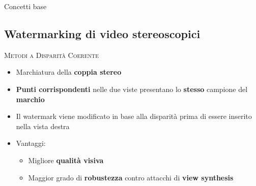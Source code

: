 \documentclass{beamer}
\begin{document}
\begin{section}{Concetti base}
\subsection{Watermarking di video stereoscopici}



\begin{frame}[t]{\textsc{Metodi a Disparit\`{a} Coerente}}
\vspace{1em}
\centering

\begin{center}
\begin{itemize}

\item Marchiatura della \textbf{coppia stereo}
\item \textbf{Punti corrispondenti} nelle due viste presentano lo \textbf{stesso} campione del \textbf{marchio}
\item Il watermark viene modificato in base alla disparit\`{a} prima di essere inserito nella vista destra 
\item Vantaggi:
	\begin{itemize}
	\item Migliore \textbf{qualit\`{a} visiva}
	\item Maggior grado di \textbf{robustezza} contro attacchi di \textbf{view synthesis}
	\end{itemize}
\end{itemize}
\end{center}
\end{frame}
 
 

\end{section}
\end{document}
